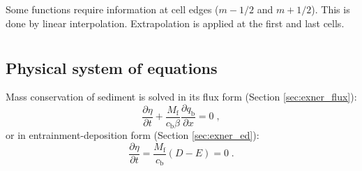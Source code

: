 \documentclass{deltares_report_elv}
\newcommand{\mathsub}[2]{#1_{\mathrm{#2}}}
\begin{document}
\section{\codeSedTrans{}}
\label{sec:codeSedTrans}

\section{\codeInterpolate{}}
\label{sec:codeInterpolate}

Some functions require information at cell edges ($m-1/2$ and $m+1/2$). This is done by linear interpolation. Extrapolation is applied at the first and last cells.

\section{\codeStruiksma{}}
\label{sec:codeStruiksma}

\section{\codeParticleActivity{}}
\label{sec:codeParticleActivity}

\section{\codeNodalPoint{}}
\label{sec:codeNodalPoint}

\section{\codeBedLevelUpdate{}}
\label{sec:codeBedLevelUpdate}

\subsection{Physical system of equations}

Mass conservation of sediment is solved in its flux form (Section \ref{sec:exner_flux}):
\begin{equation}
\label{eq:exner_flux}
\frac{\partial \eta}{\partial t}+\frac{\mathsub{M}{f}}{\mathsub{c}{b}\beta}\frac{\partial \mathsub{q}{b}}{\partial x}=0 \;,
\end{equation}
or in entrainment-deposition form (Section \ref{sec:exner_ed}):
\begin{equation}
\frac{\partial \eta}{\partial t}=\frac{\mathsub{M}{f}}{\mathsub{c}{b}}\left(D-E\right)=0 \;.
\end{equation}
\end{document}
